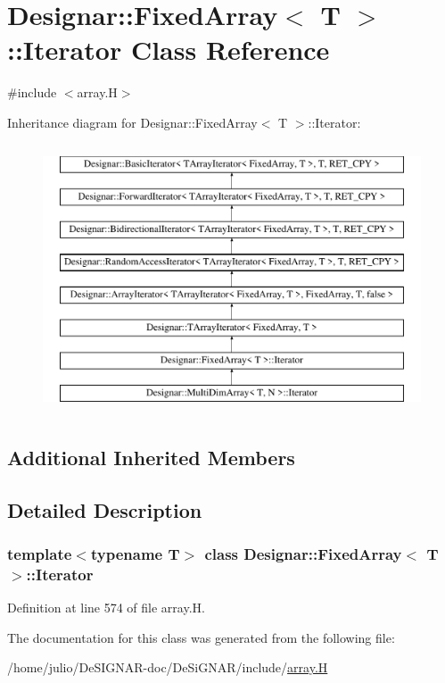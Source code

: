 \hypertarget{class_designar_1_1_fixed_array_1_1_iterator}{}\section{Designar\+:\+:Fixed\+Array$<$ T $>$\+:\+:Iterator Class Reference}
\label{class_designar_1_1_fixed_array_1_1_iterator}


{\ttfamily \#include $<$array.\+H$>$}

Inheritance diagram for Designar\+:\+:Fixed\+Array$<$ T $>$\+:\+:Iterator\+:\begin{figure}[H]
\begin{center}
\leavevmode
\includegraphics[height=8.000000cm]{class_designar_1_1_fixed_array_1_1_iterator}
\end{center}
\end{figure}
\subsection*{Additional Inherited Members}


\subsection{Detailed Description}
\subsubsection*{template$<$typename T$>$\newline
class Designar\+::\+Fixed\+Array$<$ T $>$\+::\+Iterator}



Definition at line 574 of file array.\+H.



The documentation for this class was generated from the following file\+:\begin{DoxyCompactItemize}
\item 
/home/julio/\+De\+S\+I\+G\+N\+A\+R-\/doc/\+De\+Si\+G\+N\+A\+R/include/\hyperlink{array_8_h}{array.\+H}\end{DoxyCompactItemize}
